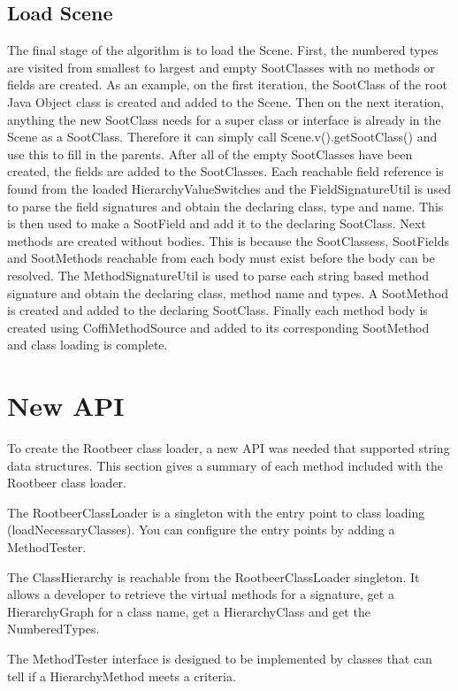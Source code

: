 \documentclass[preprint]{sigplanconf}
\begin{document}
\subsection{Load Scene}
The final stage of the algorithm is to load the Scene. First, the numbered types are visited from smallest to largest and empty SootClasses with no methods or fields are created. As an example, on the first iteration, the SootClass of the root Java Object class is created and added to the Scene. Then on the next iteration, anything the new SootClass needs for a super class or interface is already in the Scene as a SootClass. Therefore it can simply call Scene.v().getSootClass() and use this to fill in the parents.
After all of the empty SootClasses have been created, the fields are added to the SootClasses. Each reachable field reference is found from the loaded HierarchyValueSwitches and the FieldSignatureUtil is used to parse the field signatures and obtain the declaring class, type and name. This is then used to make a SootField and add it to the declaring SootClass. 
Next methods are created without bodies. This is because the SootClassess, SootFields and SootMethods reachable from each body must exist before the body can be resolved. The MethodSignatureUtil is used to parse each string based method signature and obtain the declaring class, method name and types. A SootMethod is created and added to the declaring SootClass.
Finally each method body is created using CoffiMethodSource and added to its corresponding SootMethod and class loading is complete.

\section{New API}
\label{sec:api}
To create the Rootbeer class loader, a new API was needed that supported string data structures. This section gives a summary of each method included with the Rootbeer class loader.

The RootbeerClassLoader is a singleton with the entry point to class loading (loadNecessaryClasses). You can configure the entry points by adding a MethodTester.

The ClassHierarchy is reachable from the RootbeerClassLoader singleton. It allows a developer to retrieve the virtual methods for a signature, get a HierarchyGraph for a class name, get a HierarchyClass and get the NumberedTypes.

The MethodTester interface is designed to be implemented by classes that can tell if a HierarchyMethod meets a criteria.
\end{document}
